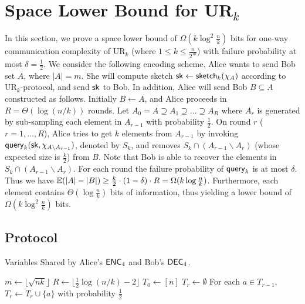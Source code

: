 \section{Space Lower Bound for UR$_k$}\label{sec:k-samples-lb}

In this section, we prove a space lower bound of $\Omega(k\log^2
\frac{n}{k})$ bits for one-way communication complexity of UR$_k$ (where $1\le k \le \frac{n}{2^{10}}$) with failure probability at most $\delta = \frac{1}{2}$.
We consider the following encoding scheme. 
Alice wants to send Bob set $A$, where $|A|=m$. 
She will compute sketch $\mathsf{sk}\leftarrow \mathsf{sketch}_k(\chi_A)$ according to UR$_k$-protocol, and send $\mathsf{sk}$ to Bob. 
In addition, Alice will send Bob $B\subseteq A$ constructed as follows.
Initially $B\leftarrow A$, and Alice proceeds in $R=\Theta(\log (n/k))$ rounds. 
Let $A_0=A\supseteq A_1\supseteq \ldots \supseteq A_R$ where $A_r$ is generated by sub-sampling each element in $A_{r-1}$ with probability $\frac{1}{2}$. 
On round $r$ ($r=1,\ldots, R$), Alice tries to get $k$ elements from $A_{r-1}$ by invoking $\mathsf{query}_k(\mathsf{sk}, \chi_{A\backslash A_{r-1}})$, denoted by $S_k$, and removes $S_k\cap (A_{r-1}\backslash A_{r})$ (whose expected size is $\frac{k}{2}$) from $B$. 
Note that Bob is able to recover the elements in $S_k\cap (A_{r-1}\backslash A_{r})$. 
For each round the failure probability of $\mathsf{query}_k$ is at most $\delta$. 
Thus we have $\operatorname*{\mathbb{E}}(|A|-|B|)\ge \frac{k}{2}\cdot (1-\delta) \cdot R=\Omega(k\log\frac{n}{k})$. 
Furthermore, each element contains $\Theta(\log \frac{n}{k})$ bits of information, thus yielding a lower bound of $\Omega(k\log^2\frac{n}{k})$ bits.

\subsection{Protocol}
\begin{algorithm}[H] 
  \caption{Variables Shared by Alice's $\textsf{ENC}_4$ and Bob's $\textsf{DEC}_4$.} \label{algo:para4}
  \begin{algorithmic}[1] 
    \State $m\leftarrow \lfloor \sqrt{nk} \rfloor$
    \State $R\leftarrow \lfloor \frac{1}{2}\log (n/k) - 2 \rfloor$ 
    \State $T_0\leftarrow [n]$
      \State $T_r\leftarrow \emptyset$
      \State For each $a\in T_{r-1}$, $T_r\leftarrow T_r\cup \{a\}$ with probability $\frac{1}{2}$ 
    \EndFor
  \end{algorithmic}
\end{algorithm}

